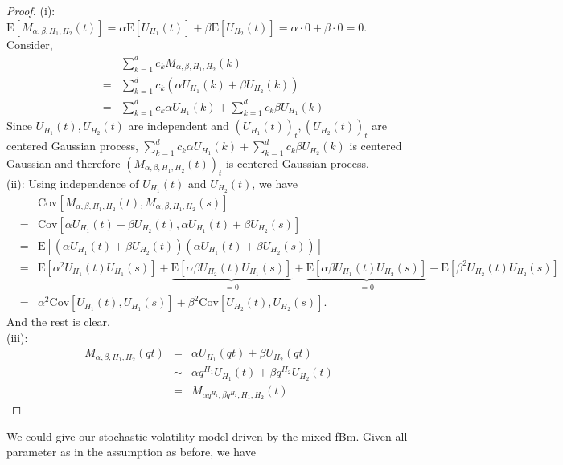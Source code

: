 \documentclass[a4paper, twoside, 11pt]{article}
\theoremstyle{definition}
\begin{document}
\begin{proof}
  (i): $\mathrm{E}[M_{\alpha,\beta,H_1,H_2}(t)] = \alpha \mathrm{E}[U_{H_1}(t)] + \beta \mathrm{E}[U_{H_2}(t)] = \alpha \cdot 0 + \beta \cdot 0 = 0$.
  Consider,
  \begin{eqnarray*}
	&&\sum\limits_{k=1}^{d} c_k M_{\alpha,\beta,H_1,H_2}(k)\\
	&=& \sum\limits_{k=1}^{d} c_k (\alpha U_{H_1}(k) + \beta U_{H_2}(k))\\
	&=& \sum\limits_{k=1}^{d} c_k \alpha U_{H_1}(k) + \sum\limits_{k=1}^{d} c_k \beta U_{H_1}(k)
  \end{eqnarray*}
  Since $U_{H_1}(t), U_{H_2}(t)$ are independent and $(U_{H_1}(t))_t, (U_{H_2}(t))_t$ are centered Gaussian process, $\sum\limits_{k=1}^{d} c_k \alpha U_{H_1}(k) + \sum\limits_{k=1}^{d} c_k \beta U_{H_2}(k)$ is centered Gaussian and therefore $(M_{\alpha,\beta,H_1,H_2}(t))_t$ is centered Gaussian process. \\
  (ii): Using independence of $U_{H_1}(t)$ and $U_{H_2}(t)$, we have
  \begin{eqnarray*}
	&&\mathrm{Cov}[M_{\alpha,\beta,H_1,H_2}(t), M_{\alpha,\beta,H_1,H_2}(s)]\\
	&=& \mathrm{Cov}[\alpha U_{H_1}(t)+\beta U_{H_2}(t), \alpha U_{H_1}(t)+\beta U_{H_2}(s)]\\
	&=& \mathrm{E}[(\alpha U_{H_1}(t)+\beta U_{H_2}(t)) (\alpha U_{H_1}(t)+\beta U_{H_2}(s))]\\
	&=& \mathrm{E}[\alpha^2U_{H_1}(t)U_{H_1}(s)] + \underbrace{\mathrm{E}[\alpha \beta U_{H_2}(t)U_{H_1}(s)]}_{=0} + \underbrace{\mathrm{E}[\alpha\beta U_{H_1}(t)U_{H_2}(s)]}_{=0} +\mathrm{E}[\beta^2 U_{H_2}(t)U_{H_2}(s)] \\
	&=& \alpha^2 \mathrm{Cov}[U_{H_1}(t), U_{H_1}(s)] + \beta^2\mathrm{Cov}[U_{H_2}(t), U_{H_2}(s)].
  \end{eqnarray*}
And the rest is clear.\\
(iii): 
\begin{eqnarray*}
  M_{\alpha,\beta,H_1,H_2}(qt) &=&  \alpha U_{H_1}(qt)+\beta U_{H_2}(qt)\\
  &\sim& \alpha q^{H_1} U_{H_1}(t) + \beta q^{H_2} U_{H_2}(t)\\
  &=& M_{\alpha q^{H_1}, \beta q^{H_2}, H_1, H_2}(t)
\end{eqnarray*}
\end{proof}
We could give our stochastic volatility model driven by the mixed fBm. Given all parameter as in the assumption as before, we have 
\end{document}
